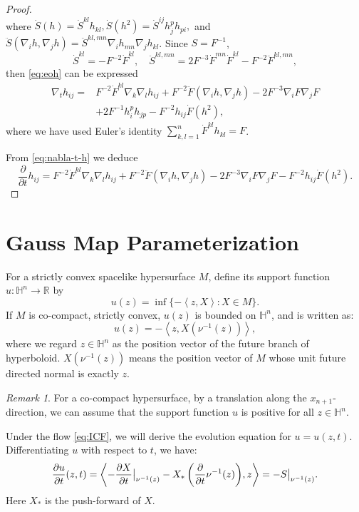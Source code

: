 \documentclass[reqno]{amsart}
\theoremstyle{remark}
\newtheorem{remark}[theorem]{Remark}
\newcommand{\R}{\ensuremath{\mathbb{R}}}
\renewcommand{\H}{{\mathbb{H}}}
\newcommand{\pd}[2]{\frac{\partial {#1}}{\partial {#2}}}
\newcommand{\ip}[2]{\ensuremath{\left< {#1}, {#2} \right>}}
\theoremstyle{definition}
\numberwithin{equation}{section}
\begin{document}
\begin{proof}
\begin{equation}
\end{equation}
where \(\dot{S}(h) = \dot{S}^{kl}h_{kl},\dot{S}(h^2) = \dot{S}^{ij}h_j^p h_{pi},\) and \(\ddot{S}(\nabla_i h, \nabla_j h) = \ddot{S}^{kl,mn}\nabla_i h_{mn}\nabla_j h_{kl}\). Since \(S = F^{-1}\), 
\[\dot{S}^{kl} = -F^{-2}\dot{F}^{kl}, \quad \ddot{S}^{kl,mn} = 2F^{-3}\dot{F}^{mn}\dot{F}^{kl}-F^{-2}\ddot{F}^{kl,mn}, \]
then \eqref{eq:eoh} can be expressed
\begin{equation}\label{eq:nabla-t-h}
    \begin{aligned}
        \nabla_t h_{ij} = &F^{-2}\dot{F}^{kl}\nabla_k\nabla_l h_{ij}+F^{-2}\ddot{F}(\nabla_i h, \nabla_j h)-2F^{-3}\nabla_i F \nabla_j F\\
        &+ 2F^{-1}h_i^p h_{jp} - F^{-2}h_{ij}\dot{F}(h^2),
    \end{aligned}
\end{equation}
where we have used Euler's identity \(\sum_{k,l=1}^{n}\dot{F}^{kl}h_{kl} = F\). 
\par From \eqref{eq:nabla-t-h} we deduce 
\begin{equation}\label{eq:evolution of h}
    \pd{}{t} h_{ij} = F^{-2}\dot{F}^{kl}\nabla_k\nabla_l h_{ij}+F^{-2}\ddot{F}(\nabla_i h, \nabla_j h)-2F^{-3}\nabla_i F \nabla_j F - F^{-2}h_{ij}\dot{F}(h^2).
\end{equation}

\end{proof}


\section{Gauss Map Parameterization}\label{sec:gauss-map}

For a strictly convex spacelike hypersurface \(M \), define its support function \(u:\H^n \to \R\) by \[ u(z) = \inf\{-\ip{z}{X}: X \in M\}. \]  
If \(M\) is co-compact, strictly convex, \(u(z)\) is bounded on \( \H^n\), and is written as:
\[ u(z) = -\ip{z}{X(\nu^{-1}(z))},  \]
where we regard \(z\in \H^n\) as the position vector of the future branch of hyperboloid. \(X(\nu^{-1}(z))\) means the position vector of \(M\) whose unit future directed normal is exactly \(z\). 
\begin{remark}
  For a co-compact hypersurface, by a translation along the \(x_{n+1}\)-direction, we can assume that the support function \(u\) is positive for all \(z \in \H^n\). 
\end{remark}

\par Under the flow \eqref{eq:ICF}, we will derive the evolution equation for \(u = u(z,t)\). Differentiating $u$ with respect to \(t\), we have: 
\begin{equation}\label{eq:pd{u}{t}}
    \pd{u}{t}(z,t) = \ip{-\pd{X}{t}\big|_{\nu^{-1}(z)} - X_{*}\left( \pd{}{t}\nu^{-1}(z) \right)}{z} = -S\big|_{\nu^{-1}(z)}.
\end{equation}
Here $X_*$ is the push-forward of $X$.
\end{document}
